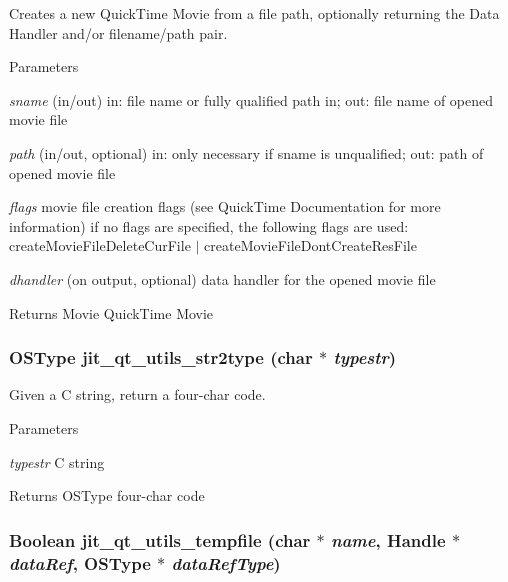 Creates a new QuickTime Movie from a file path, optionally returning the Data Handler and/or filename/path pair. 
\begin{DoxyParams}{Parameters}
\item[{\em sname}](in/out) in: file name or fully qualified path in; out: file name of opened movie file \item[{\em path}](in/out, optional) in: only necessary if sname is unqualified; out: path of opened movie file \item[{\em flags}]movie file creation flags (see QuickTime Documentation for more information) if no flags are specified, the following flags are used: createMovieFileDeleteCurFile $|$ createMovieFileDontCreateResFile \item[{\em dhandler}](on output, optional) data handler for the opened movie file\end{DoxyParams}
\begin{DoxyReturn}{Returns}
Movie QuickTime Movie 
\end{DoxyReturn}
\hypertarget{group__qtutilsmod_gade510ea93026d6664050c98923c19338}{
\subsubsection[{jit\_\-qt\_\-utils\_\-str2type}]{\setlength{\rightskip}{0pt plus 5cm}OSType jit\_\-qt\_\-utils\_\-str2type (char $\ast$ {\em typestr})}}
\label{group__qtutilsmod_gade510ea93026d6664050c98923c19338}


Given a C string, return a four-\/char code. 
\begin{DoxyParams}{Parameters}
\item[{\em typestr}]C string\end{DoxyParams}
\begin{DoxyReturn}{Returns}
OSType four-\/char code 
\end{DoxyReturn}
\hypertarget{group__qtutilsmod_gacd69ab321ef0b89a3ed6a74074e0fcdb}{
\subsubsection[{jit\_\-qt\_\-utils\_\-tempfile}]{\setlength{\rightskip}{0pt plus 5cm}Boolean jit\_\-qt\_\-utils\_\-tempfile (char $\ast$ {\em name}, \/  Handle $\ast$ {\em dataRef}, \/  OSType $\ast$ {\em dataRefType})}}
\label{group__qtutilsmod_gacd69ab321ef0b89a3ed6a74074e0fcdb}


